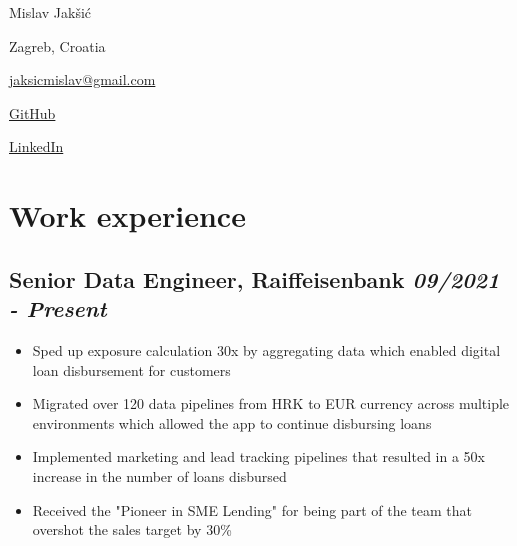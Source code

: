 \documentclass[a4paper]{article}
\newcommand{\bolditalicpair}
[2]
{\textbf{#1} \texorpdfstring{\hfill}{} \textit{#2}}
\begin{document}
\pagecolor{BackgroundColor}

\begin{multicols}{3}

\noindent
\begin{minipage}{.22\textwidth}
\raggedright

{\huge Mislav Jakšić}

Zagreb, Croatia
\end{minipage}

\noindent
\begin{minipage}{.50\textwidth}
\raggedleft

\end{minipage}

\noindent
\begin{minipage}{.32\textwidth}
\raggedleft

\href{mailto:jaksicmislav@gmail.com}{jaksicmislav@gmail.com}

\href{https://github.com/MislavJaksic}{GitHub}

\href{https://www.linkedin.com/in/mislav-jaksic}{LinkedIn}

\end{minipage}

\end{multicols}



\section{Work experience}

\subsection{\bolditalicpair{Senior Data Engineer, Raiffeisenbank}{09/2021 - Present}}

\begin{itemize}
 \item Sped up exposure calculation 30x by aggregating data which enabled digital loan disbursement for customers
 \item Migrated over 120 data pipelines from HRK to EUR currency across multiple environments which allowed the app to continue disbursing loans
 \item Implemented marketing and lead tracking pipelines that resulted in a 50x increase in the number of loans disbursed
 \item Received the "Pioneer in SME Lending" for being part of the team that overshot the sales target by 30\%
\end{itemize}
\end{document}
